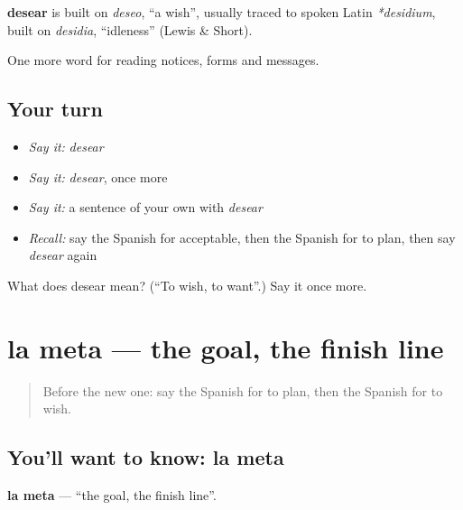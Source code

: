 \begin{cousinweb}
\textbf{desear} is built on \emph{deseo}, \textquotedblleft{}a wish\textquotedblright{}, usually traced to spoken Latin \emph{*desidium}, built on \emph{desidia}, \textquotedblleft{}idleness\textquotedblright{} (Lewis \& Short).
\end{cousinweb}

\begin{grammarlens}[title={What you've built}]
One more word for reading notices, forms and messages.
\end{grammarlens}

\subsection*{Your turn}
\begin{itemize}
\raggedright
  \item \emph{Say it:} \emph{desear}
  \item \emph{Say it:} \emph{desear}, once more
  \item \emph{Say it:} a sentence of your own with \emph{desear}
  \item \emph{Recall:} say the Spanish for acceptable, then the Spanish for to plan, then say \emph{desear} again
\end{itemize}

\begin{tcolorbox}[breakable,colback=teal!4,colframe=teal!35!black,title={Before you move on}]
What does desear mean? (\textquotedblleft{}To wish, to want\textquotedblright{}.) Say it once more.
\end{tcolorbox}
\section[la meta]{la meta — the goal, the finish line}

\label{lesson:ES-C509-meta}



\begin{quote}
Before the new one: say the Spanish for to plan, then the Spanish for to wish.
\end{quote}

\subsection*{You'll want to know: la meta}
\textbf{la meta} — \textquotedblleft{}the goal, the finish line\textquotedblright{}.

